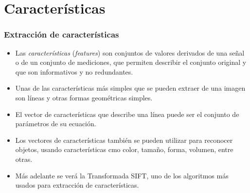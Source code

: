 \section{Características}

\begin{frame}\frametitle{Extracción de características}
  \begin{itemize}
  \item Las \textit{características} (\textit{features}) son conjuntos de valores derivados de una señal o de un conjunto de mediciones, que permiten describir el conjunto original y que son informativos y no redundantes.
  \item   Unas de las características más simples que se pueden extraer de una imagen son líneas y otras formas geométricas simples.
  \item El vector de características que describe una línea puede ser el conjunto de parámetros de su ecuación.
  \item Los vectores de características también se pueden utilizar para reconocer objetos, usando características cmo color, tamaño, forma, volumen, entre otras.
   \item Más adelante se verá la Transformada SIFT, uno de los algoritmos más usados para extracción de características. 
  \end{itemize}
\end{frame}

